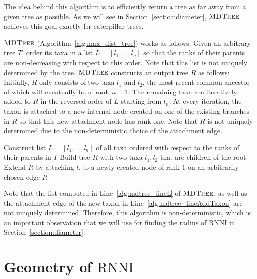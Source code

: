 \documentclass{amsart}
\newcommand{\rnni}{\mathrm{RNNI}}
\newcommand{\mdtree}{\textsc{MDTree}}
\begin{document}
The idea behind this algorithm is to efficiently return a tree as far away from a given tree as possible.
As we will see in Section~\ref{section:diameter}, $\mdtree$ achieves this goal exactly for caterpillar trees.

$\mdtree$ (Algorithm~\ref{alg:max_dist_tree}) works as follows.
Given an arbitrary tree $T$, order its taxa in a list $L = [l_1, \ldots, l_n]$ so that the ranks of their parents are non-decreasing with respect to this order.
Note that this list is not uniquely determined by the tree.
$\mdtree$ constructs an output tree $R$ as follows:
Initially, $R$ only consists of two taxa $l_1$ and $l_2$, the most recent common ancestor of which will eventually be of rank $n - 1$.
The remaining taxa are iteratively added to $R$ in the reversed order of $L$ starting from $l_n$.
At every iteration, the taxon is attached to a new internal node created on one of the existing branches in $R$ so that this new attachment node has rank one.
Note that $R$ is not uniquely determined due to the non-deterministic choice of the attachment edge.

\begin{algorithm}[H]
\caption{$\mdtree(T)$}
\label{alg:max_dist_tree}
\begin{algorithmic}[1]
\STATE Construct list $L=[l_1, \ldots, l_n]$ of all taxa ordered with respect to the ranks of their parents in $T$
\label{alg:mdtree_lineL}
\STATE Build tree $R$ with two taxa $l_1, l_2$ that are children of the root
\STATE Extend $R$ by attaching $l_i$ to a newly created node of rank $1$ on an arbitrarily chosen edge
\label{alg:mdtree_lineAddTaxon}
\ENDFOR
\RETURN $R$
\end{algorithmic}
\end{algorithm}

Note that the list computed in Line~\ref{alg:mdtree_lineL} of $\mdtree$, as well as the attachment edge of the new taxon in Line~\ref{alg:mdtree_lineAddTaxon} are not uniquely determined.
Therefore, this algorithm is non-deterministic, which is an important observation that we will use for finding the radius of $\rnni$ in Section~\ref{section:diameter}.


\section{Geometry of $\rnni$}
\label{section:geometry}
\end{document}
